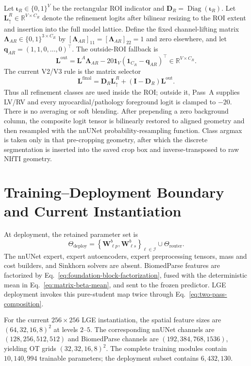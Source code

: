 \documentclass[10pt]{article}
\newcommand{\R}{\mathbb{R}}
\newcommand{\cI}{\mathcal{I}}
\newcommand{\ones}{\bm{1}}
\newcommand{\diag}{\operatorname{Diag}}
\begin{document}
Let $\bm\iota_R\in\{0,1\}^{V}$ be the rectangular ROI indicator and
$\bm D_R=\diag(\bm\iota_R)$.  Let $\bm L^R_{\uparrow}\in\R^{V\times C_R}$ denote
the refinement logits after bilinear resizing to the ROI extent and insertion
into the full model lattice.  Define the fixed channel-lifting matrix
$\bm\Lambda_{AR}\in\{0,1\}^{3\times C_R}$ by
$[\bm\Lambda_{AR}]_{11}=[\bm\Lambda_{AR}]_{22}=1$ and zero elsewhere, and let
$\bm q_{AR}=(1,1,0,\ldots,0)^\top$.  The outside-ROI fallback is
\begin{equation}
 \bm L^{\mathrm{out}}
 =\bm L^A\bm\Lambda_{AR}
   -20\ones_V(\ones_{C_R}-\bm q_{AR})^\top
 \in\R^{V\times C_R}.
\end{equation}
The current V2/V3 rule is the matrix selector
\begin{equation}
    \boxed{
    \bm L^{\mathrm{final}}
    =\bm D_R\bm L^R_{\uparrow}
     +(\bm I-\bm D_R)\bm L^{\mathrm{out}}.}
    \label{eq:matrix-hard-switch}
\end{equation}
Thus all refinement classes are used inside the ROI; outside it, Pass~A supplies
LV/RV and every myocardial/pathology foreground logit is clamped to $-20$.
There is no averaging or soft blending.  After prepending a zero background
column, the composite logit tensor is bilinearly restored to aligned geometry
and then resampled with the nnUNet probability-resampling function.  Class
argmax is taken only in that pre-cropping geometry, after which the discrete
segmentation is inserted into the saved crop box and inverse-transposed to raw
NIfTI geometry.

\section{Training--Deployment Boundary and Current Instantiation}

At deployment, the retained parameter set is
\begin{equation}
    \Theta_{\mathrm{deploy}}
    =\left\{\bm W^b_{\ell p},\bm W^b_{\ell s}
      \right\}_{\ell\in\cI}\cup\Theta_{\mathrm{router}}.
\end{equation}
The nnUNet expert, expert autoencoders, expert preprocessing tensors, mass and
cost builders, and Sinkhorn solvers are absent.  BiomedParse features are
factorized by Eq.~\eqref{eq:foundation-block-factorization}, fused with the
deterministic mean in Eq.~\eqref{eq:matrix-beta-mean}, and sent to the frozen
predictor.  LGE deployment invokes this pure-student map twice through
Eq.~\eqref{eq:two-pass-composition}.

For the current $256\times256$ LGE instantiation, the spatial feature sizes are
$(64,32,16,8)^2$ at levels $2$--$5$.  The corresponding nnUNet channels are
$(128,256,512,512)$ and BiomedParse channels are
$(192,384,768,1536)$, yielding OT grids $(32,32,16,8)^2$.  The complete
training modules contain $10{,}140{,}994$ trainable parameters; the deployment
subset contains $6{,}432{,}130$.
\end{document}
